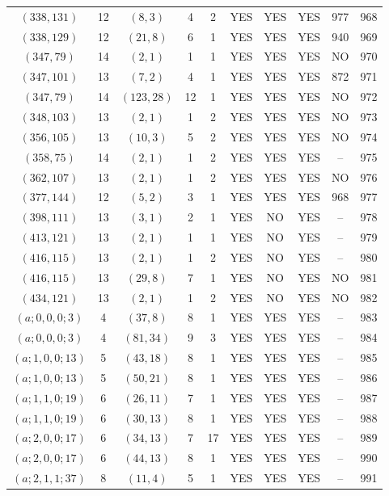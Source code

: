\begin{longtable}{|c|c|c|c|c|c|c|c|c|c|}
$(338, 131)$ & 12 & $(8, 3)$ & 4 & 2 & YES & YES & YES & 977 & 968\\
$(338, 129)$ & 12 & $(21, 8)$ & 6 & 1 & YES & YES & YES & 940 & 969\\
$(347, 79)$ & 14 & $(2, 1)$ & 1 & 1 & YES & YES & YES & NO & 970\\
$(347, 101)$ & 13 & $(7, 2)$ & 4 & 1 & YES & YES & YES & 872 & 971\\
$(347, 79)$ & 14 & $(123, 28)$ & 12 & 1 & YES & YES & YES & NO & 972\\
$(348, 103)$ & 13 & $(2, 1)$ & 1 & 2 & YES & YES & YES & NO & 973\\
$(356, 105)$ & 13 & $(10, 3)$ & 5 & 2 & YES & YES & YES & NO & 974\\
$(358, 75)$ & 14 & $(2, 1)$ & 1 & 2 & YES & YES & YES & -- & 975\\
$(362, 107)$ & 13 & $(2, 1)$ & 1 & 2 & YES & YES & YES & NO & 976\\
$(377, 144)$ & 12 & $(5, 2)$ & 3 & 1 & YES & YES & YES & 968 & 977\\
$(398, 111)$ & 13 & $(3, 1)$ & 2 & 1 & YES & NO & YES & -- & 978\\
$(413, 121)$ & 13 & $(2, 1)$ & 1 & 1 & YES & NO & YES & -- & 979\\
$(416, 115)$ & 13 & $(2, 1)$ & 1 & 2 & YES & NO & YES & -- & 980\\
$(416, 115)$ & 13 & $(29, 8)$ & 7 & 1 & YES & NO & YES & NO & 981\\
$(434, 121)$ & 13 & $(2, 1)$ & 1 & 2 & YES & NO & YES & NO & 982\\
$(a; 0, 0, 0; 3)$ & 4 & $(37, 8)$ & 8 & 1 & YES & YES & YES & -- & 983\\
$(a; 0, 0, 0; 3)$ & 4 & $(81, 34)$ & 9 & 3 & YES & YES & YES & -- & 984\\
$(a; 1, 0, 0; 13)$ & 5 & $(43, 18)$ & 8 & 1 & YES & YES & YES & -- & 985\\
$(a; 1, 0, 0; 13)$ & 5 & $(50, 21)$ & 8 & 1 & YES & YES & YES & -- & 986\\
$(a; 1, 1, 0; 19)$ & 6 & $(26, 11)$ & 7 & 1 & YES & YES & YES & -- & 987\\
$(a; 1, 1, 0; 19)$ & 6 & $(30, 13)$ & 8 & 1 & YES & YES & YES & -- & 988\\
$(a; 2, 0, 0; 17)$ & 6 & $(34, 13)$ & 7 & 17 & YES & YES & YES & -- & 989\\
$(a; 2, 0, 0; 17)$ & 6 & $(44, 13)$ & 8 & 1 & YES & YES & YES & -- & 990\\
$(a; 2, 1, 1; 37)$ & 8 & $(11, 4)$ & 5 & 1 & YES & YES & YES & -- & 991\\

\end{longtable}
